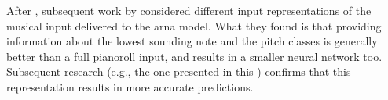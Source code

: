 
After \textcite{chen2018functional}, subsequent work by
\textcite{micchi2020not} considered different input
representations of the musical input delivered to the
\gls{arna} model. What they found is that providing
information about the lowest sounding note and the pitch
classes is generally better than a full pianoroll input, and
results in a smaller neural network too. Subsequent research
(e.g., the one presented in this \thesisdiss{}) confirms
that this representation results in more accurate
predictions.
